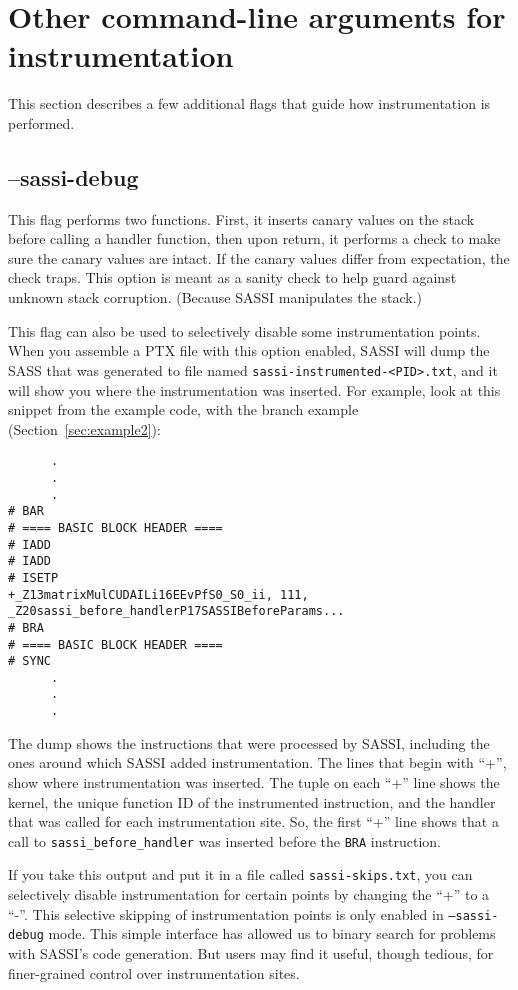 \pagebreak
\section{Other command-line arguments for instrumentation}
\label{sec:command-line-args}

This section describes a few additional flags that guide how
instrumentation is performed. 

\subsection{--sassi-debug}

This flag performs two functions.  First, it inserts canary
values on the stack before calling a handler function, then upon
return, it performs a check to make sure the canary values are
intact.  If the canary values differ from expectation, the check
traps.  This option is meant as a sanity check to help guard against
unknown stack corruption. (Because SASSI manipulates the
stack.) 

This flag can also be used to selectively disable some instrumentation
points.  When you assemble a PTX file with this option enabled, SASSI
will dump the SASS that was generated to file named
\texttt{sassi-instrumented-<PID>.txt}, and it will show you where the
instrumentation was inserted.  For example, look at this snippet from
the example code, with the branch example
(Section~\ref{sec:example2}):
\begin{verbatim}
      .
      .
      .
# BAR
# ==== BASIC BLOCK HEADER ====
# IADD
# IADD
# ISETP
+_Z13matrixMulCUDAILi16EEvPfS0_S0_ii, 111, _Z20sassi_before_handlerP17SASSIBeforeParams...
# BRA
# ==== BASIC BLOCK HEADER ====
# SYNC
      .
      .
      .
\end{verbatim}
The dump shows the instructions that were processed by SASSI,
including the ones around which SASSI added instrumentation.  The
lines that begin with ``+'', show where instrumentation was inserted.
The tuple on each ``+'' line shows the kernel, the unique function ID
of the instrumented instruction, and the handler that was called for
each instrumentation site.  So, the first ``+'' line shows that a call
to \texttt{sassi\_before\_handler} was inserted before the \texttt{BRA}
instruction.

If you take this output and put it in a file called
\texttt{sassi-skips.txt}, you can selectively disable instrumentation
for certain points by changing the ``+'' to a ``-''.  This selective
skipping of instrumentation points is only enabled in
\texttt{--sassi-debug} mode.  This simple interface has allowed us to
binary search for problems with SASSI's code generation.  But users
may find it useful, though tedious, for finer-grained control over
instrumentation sites.

